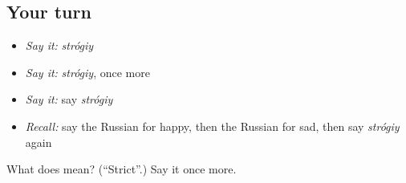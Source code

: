 \subsection*{Your turn}
\begin{itemize}
\raggedright
  \item \emph{Say it:} \emph{strógiy}
  \item \emph{Say it:} \emph{strógiy}, once more
  \item \emph{Say it:} say \emph{strógiy}
  \item \emph{Recall:} say the Russian for happy, then the Russian for sad, then say \emph{strógiy} again
\end{itemize}

\begin{tcolorbox}[breakable,colback=teal!4,colframe=teal!35!black,title={Before you move on}]
What does  mean? (\textquotedblleft{}Strict\textquotedblright{}.) Say it once more.
\end{tcolorbox}
